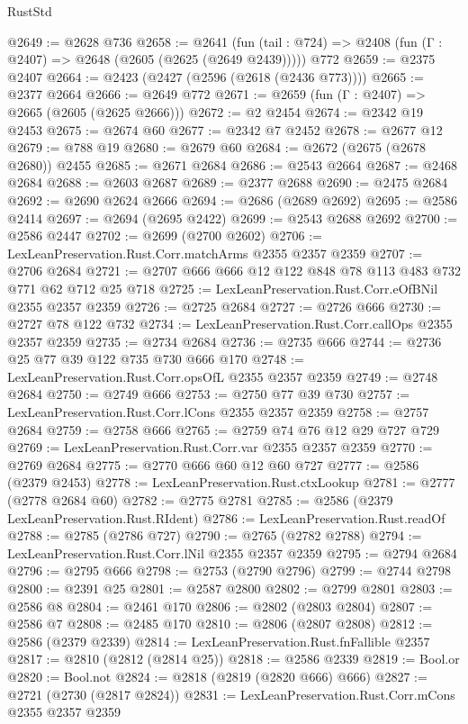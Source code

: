 \begin{lexlean}{RustStd}
\begin{coremodule}
@2649 := @2628 @736
@2658 := @2641
    (fun (tail : @724) => @2408 (fun (Γ : @2407) => @2648 (@2605 (@2625 (@2649 @2439)))))
    @772
@2659 := @2375 @2407
@2664 := @2423 (@2427 (@2596 (@2618 (@2436 @773))))
@2665 := @2377 @2664
@2666 := @2649 @772
@2671 := @2659 (fun (Γ : @2407) => @2665 (@2605 (@2625 @2666)))
@2672 := @2 @2454
@2674 := @2342 @19 @2453
@2675 := @2674 @60
@2677 := @2342 @7 @2452
@2678 := @2677 @12
@2679 := @788 @19
@2680 := @2679 @60
@2684 := @2672 (@2675 (@2678 @2680)) @2455
@2685 := @2671 @2684
@2686 := @2543 @2664
@2687 := @2468 @2684
@2688 := @2603 @2687
@2689 := @2377 @2688
@2690 := @2475 @2684
@2692 := @2690 @2624 @2666
@2694 := @2686 (@2689 @2692)
@2695 := @2586 @2414
@2697 := @2694 (@2695 @2422)
@2699 := @2543 @2688 @2692
@2700 := @2586 @2447
@2702 := @2699 (@2700 @2602)
@2706 := LexLeanPreservation.Rust.Corr.matchArms @2355 @2357 @2359
@2707 := @2706 @2684
@2721 := @2707 @666 @666 @12 @122 @848 @78 @113 @483 @732 @771 @62 @712 @25 @718
@2725 := LexLeanPreservation.Rust.Corr.eOfBNil @2355 @2357 @2359
@2726 := @2725 @2684
@2727 := @2726 @666
@2730 := @2727 @78 @122 @732
@2734 := LexLeanPreservation.Rust.Corr.callOps @2355 @2357 @2359
@2735 := @2734 @2684
@2736 := @2735 @666
@2744 := @2736 @25 @77 @39 @122 @735 @730 @666 @170
@2748 := LexLeanPreservation.Rust.Corr.opsOfL @2355 @2357 @2359
@2749 := @2748 @2684
@2750 := @2749 @666
@2753 := @2750 @77 @39 @730
@2757 := LexLeanPreservation.Rust.Corr.lCons @2355 @2357 @2359
@2758 := @2757 @2684
@2759 := @2758 @666
@2765 := @2759 @74 @76 @12 @29 @727 @729
@2769 := LexLeanPreservation.Rust.Corr.var @2355 @2357 @2359
@2770 := @2769 @2684
@2775 := @2770 @666 @60 @12 @60 @727
@2777 := @2586 (@2379 @2453)
@2778 := LexLeanPreservation.Rust.ctxLookup
@2781 := @2777 (@2778 @2684 @60)
@2782 := @2775 @2781
@2785 := @2586 (@2379 LexLeanPreservation.Rust.RIdent)
@2786 := LexLeanPreservation.Rust.readOf
@2788 := @2785 (@2786 @727)
@2790 := @2765 (@2782 @2788)
@2794 := LexLeanPreservation.Rust.Corr.lNil @2355 @2357 @2359
@2795 := @2794 @2684
@2796 := @2795 @666
@2798 := @2753 (@2790 @2796)
@2799 := @2744 @2798
@2800 := @2391 @25
@2801 := @2587 @2800
@2802 := @2799 @2801
@2803 := @2586 @8
@2804 := @2461 @170
@2806 := @2802 (@2803 @2804)
@2807 := @2586 @7
@2808 := @2485 @170
@2810 := @2806 (@2807 @2808)
@2812 := @2586 (@2379 @2339)
@2814 := LexLeanPreservation.Rust.fnFallible @2357
@2817 := @2810 (@2812 (@2814 @25))
@2818 := @2586 @2339
@2819 := Bool.or
@2820 := Bool.not
@2824 := @2818 (@2819 (@2820 @666) @666)
@2827 := @2721 (@2730 (@2817 @2824))
@2831 := LexLeanPreservation.Rust.Corr.mCons @2355 @2357 @2359

\end{coremodule}
\end{lexlean}
